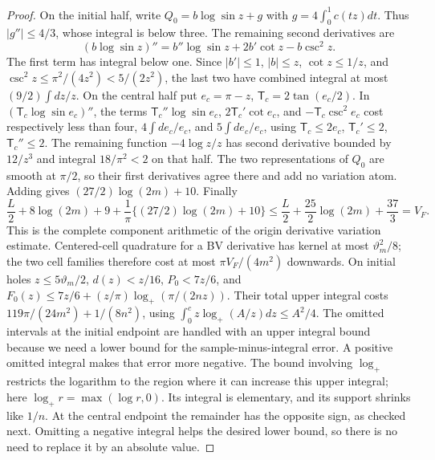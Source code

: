 \begin{proof}
On the initial half, write $Q_0=b\log\sin z+g$ with
$g=4\int_0^1c(tz)dt$. Thus $|g''|\leq4/3$, whose integral
is below three. The remaining second derivatives are
\[
 (b\log\sin z)''=b''\log\sin z+2b'\cot z-b\csc^2z.
\]
The first term has integral below one. Since $|b'|\leq1$,
$|b|\leq z$, $\cot z\leq1/z$, and
$\csc^2z\leq\pi^2/(4z^2)<5/(2z^2)$, the last two have
combined integral at most $(9/2)\int dz/z$.
On the central half put $e_c=\pi-z$, $\mathsf{T}_c=2\tan(e_c/2)$.
In $(\mathsf{T}_c\log\sin e_c)''$, the terms $\mathsf{T}_c''\log\sin e_c$,
$2\mathsf{T}_c'\cot e_c$, and $-\mathsf{T}_c\csc^2e_c$ cost respectively less than four,
$4\int de_c/e_c$, and $5\int de_c/e_c$, using
$\mathsf{T}_c\leq2e_c$, $\mathsf{T}_c'\leq2$, $\mathsf{T}_c''\leq2$. The remaining function
$-4\log z/z$ has second derivative bounded by $12/z^3$ and integral
$18/\pi^2<2$ on that half. The two representations of $Q_0$ are
smooth at $\pi/2$, so their first derivatives agree there and add no
variation atom. Adding gives
$(27/2)\log(2m)+10$. Finally
\[
 \frac L2+8\log(2m)+9+
   \frac1\pi\{(27/2)\log(2m)+10\}
 \leq\frac L2+\frac{25}{2}\log(2m)+\frac{37}{3}=V_F.
\]
This is the complete component arithmetic of the origin derivative
variation estimate.
Centered-cell quadrature for a BV derivative has kernel at most
$\vartheta_m^2/8$; the two cell families therefore cost at most
$\pi V_F/(4m^2)$ downwards. On initial holes $z\leq5\vartheta_m/2$,
$d(z)<z/16$, $P_0<7z/6$, and
$F_0(z)\leq7z/6+(z/\pi)\log_+(\pi/(2nz))$.
Their total upper integral costs
$119\pi/(24m^2)+1/(8n^2)$, using
$\int_0^c z\log_+(A/z)dz\leq A^2/4$.
The omitted intervals at the initial endpoint are handled with an
upper integral bound because we need a lower bound for the
sample-minus-integral error. A positive omitted integral makes that
error more negative. The bound involving $\log_+$ restricts the
logarithm to the region where it can increase this upper integral;
here $\log_+r=\max(\log r,0)$. Its integral is elementary, and
its support shrinks like $1/n$. At the central endpoint the remainder
has the opposite sign, as checked next. Omitting a negative integral
helps the desired lower bound, so there is no need to replace it by
an absolute value.


\end{proof}

